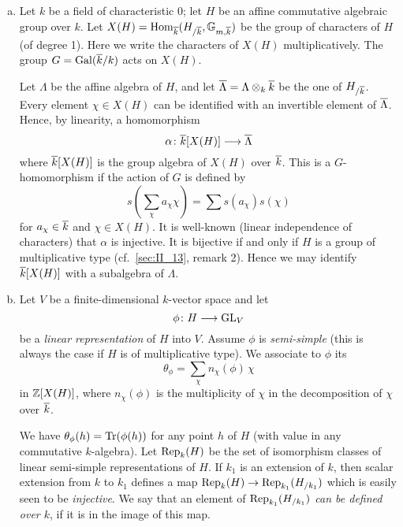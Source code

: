\begin{enumerate}[a), wide]
\item Let $k$ be a field of characteristic 0; let $H$ be an affine
	\dpage
	commutative algebraic group over $k$. Let $X(H) = \operatorname{Hom}_{\overline{k}}(H_{/\overline{k}}, \mathbb{G}_{m, \overline{k}})$ be the group of characters of $H$
	(of degree 1). Here we write the characters of $X(H)$ multiplicatively.
	The group $G = \operatorname{Gal}(\overline{k}/k)$ acts on $X(H)$.

	Let $\Lambda$ be the affine algebra of $H$, and let $\overline{\Lambda} =
	\Lambda \otimes_k \overline{k}$ be the one of $H_{/\overline{k}}$. Every
	element $\chi \in X(H)$ can be identified with an invertible element of
	$\overline{\Lambda}$. Hence, by linearity, a homomorphism
	\[
		\alpha \colon \overline{k}[X(H)] \longrightarrow \overline{\Lambda}
	\]
	where $\overline{k}[X(H)]$ is the group algebra of $X(H)$ over $\overline{k}$.
	This is a $G$-homomorphism if the action of $G$ is defined by
	\[
		s\left( \sum_{\chi} a_\chi \chi \right) = \sum s(a_\chi) s(\chi)
	\]
	for $a_\chi \in \overline{k}$ and $\chi \in X(H)$. It is well-known (linear
	independence of characters) that $\alpha$ is injective.  It is
	bijective if and only if $H$ is a group of multiplicative type (cf.\ 
	\ref{sec:II_13}, remark 2). Hence we may identify $\overline{k}[X(H)]$ with
	a subalgebra of $\Lambda$.

\item Let $V$ be a finite-dimensional $k$-vector space and let
	\[
		\phi \colon H \longrightarrow \operatorname{GL}_V
	\]
	be a \emph{linear representation} of $H$ into $V$. Assume $\phi$ is
	\emph{semi-simple} (this is always the case if $H$ is of multiplicative
	type). We associate to $\phi$ its \strong{trace}\index{Trace}
	\[
		\theta_\phi = \sum_{\chi} n_\chi(\phi) \, \chi
	\]
	in $\mathbb{Z}[X(H)]$, where $n_\chi(\phi)$ is the multiplicity of $\chi$ in
	the decomposition of $\chi$ over $\overline{k}$.

	We have $\theta_\phi(h) = \operatorname{Tr}(\phi(h))$ for any point $h$ of $H$
	\dpage
	(with value in any commutative $k$-algebra). Let $\operatorname{Rep}_k(H)$ be the set
	of isomorphism classes of linear semi-simple representations of $H$. If
	$k_1$ is an extension of $k$, then scalar extension from $k$ to $k_1$
	defines a map $\operatorname{Rep}_k(H) \to \operatorname{Rep}_{k_1}(H_{/k_1})$ which is easily seen
	to be \emph{injective}. We say that an element of
	\emph{$\operatorname{Rep}_{k_1}(H_{/k_1})$ can be defined over $k$}, if it is in the
	image of this map.


\end{enumerate}
